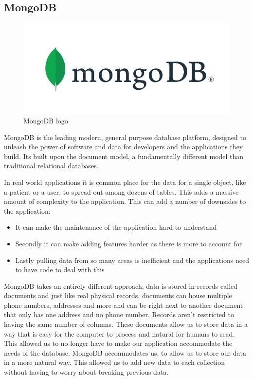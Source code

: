 \subsection{MongoDB}
\begin{figure}[th]
\renewcommand\thefigure{3.3}
\centering
\includegraphics[scale = 0.5]{img/MongoDB-logo.png}
\caption{MongoDB logo}
\label{MongoDB}
\end{figure}

MongoDB is the leading modern, general purpose database platform, designed to unleash the power of software and data for developers and the applications they build. Its built upon the document model, a fundamentally different model than traditional relational databases. \par
In real world applications it is common place for the data for a single object, like a patient or a user, to spread out among dozens of tables. This adds a massive amount of complexity to the application. This can add a number of downsides to the application:
\begin{itemize}
\item It can make the maintenance of the application hard to understand
\item Secondly it can make adding features harder as there is more to account for
\item Lastly pulling data from so many areas is inefficient and the applications need to have code to deal with this
\end{itemize}
\par MongoDB takes an entirely different approach, data is stored in records called documents and just like real physical records, documents can house multiple phone numbers, addresses and more and can be right next to another document that only has one address and no phone number. Records aren't restricted to having the same number of columns. These documents allow us to store data in a way that is easy for the computer to process and natural for humans to read. This allowed us to no longer have to make our application accommodate the needs of the database. MongoDB accommodates us, to allow us to store our data in a more natural way. This allowed us to add new data to each collection without having to worry about breaking previous data. \par

